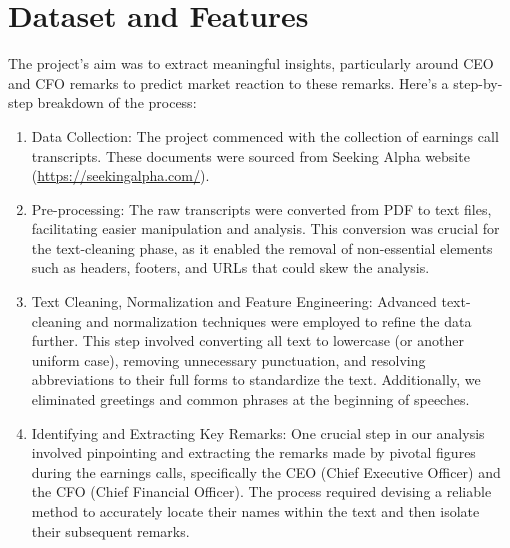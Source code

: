 \documentclass{article}
\newif\ifshowInstructions
\newcommand{\instructions}[1]{%
    \ifshowInstructions%
        \textcolor{violet}{#1}%
    \fi%
}
\begin{document}
\section{Dataset and Features}
\instructions{%
Describe your dataset: how many training/validation/test examples do you have? Is there any preprocessing you did? What about normalization or data augmentation? What is the resolution of your images? How is your time-series data discretized? Include a citation on where you obtained your dataset from. Depending on available space, show some examples from your dataset. You should also talk about the features you used. If you extracted features using Fourier transforms, word2vec, histogram of oriented gradients (HOG), PCA, ICA, etc. make sure to talk about it. Try to include examples of your data in the report (e.g. include an image, show a waveform, etc.).
}

The project's aim was to extract meaningful insights, particularly around CEO and CFO remarks to predict market reaction to these remarks. Here's a step-by-step breakdown of the process:
\begin{enumerate}
    \item Data Collection: The project commenced with the collection of earnings call transcripts. These documents were sourced from Seeking Alpha website (\hyperref[www]{https://seekingalpha.com/}).
  \item Pre-processing: The raw transcripts were converted from PDF to text files, facilitating easier manipulation and analysis. This conversion was crucial for the text-cleaning phase, as it enabled the removal of non-essential elements such as headers, footers, and URLs that could skew the analysis.
  \item Text Cleaning, Normalization and Feature Engineering: Advanced text-cleaning and normalization techniques were employed to refine the data further. This step involved converting all text to lowercase (or another uniform case), removing unnecessary punctuation, and resolving abbreviations to their full forms to standardize the text. Additionally, we eliminated greetings and common phrases at the beginning of speeches.
  \item Identifying and Extracting Key Remarks: One crucial step in our analysis involved pinpointing and extracting the remarks made by pivotal figures during the earnings calls, specifically the CEO (Chief Executive Officer) and the CFO (Chief Financial Officer). The process required devising a reliable method to accurately locate their names within the text and then isolate their subsequent remarks.

\end{enumerate}
\end{document}

